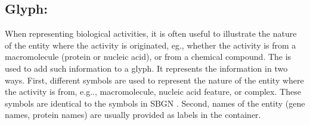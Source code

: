 \subsection{Glyph: }
\label{sec:af:unitInfo}

When representing biological activities, it is often useful to illustrate the nature of the entity where the activity is originated, eg., whether the activity is from a macromolecule (protein or nucleic acid), or from a chemical compound.  The \SBGNAFLone {} is used to add such information to a glyph.  It represents the information in two ways.  First, different symbols are used to represent the nature of the entity where the activity is from, e.g.., macromolecule, nucleic acid feature, or complex.  These symbols are identical to the  symbols in SBGN \PDl.  Second, names of the entity (gene names, protein names) are usually provided as labels in the  container.

